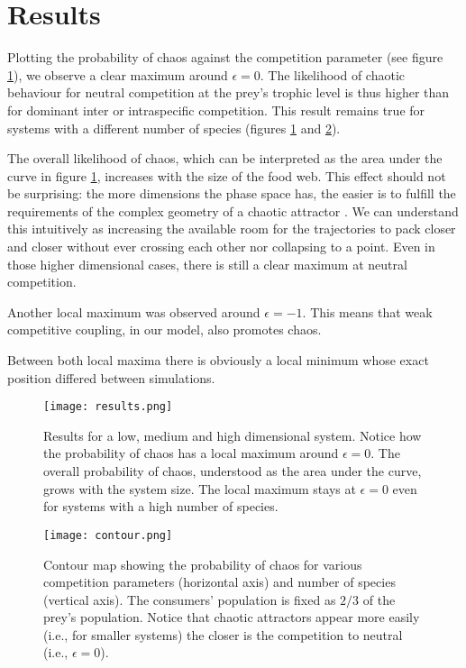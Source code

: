 \section{Results}
\label{sec:Results}
Plotting the probability of chaos against the competition parameter (see figure \ref{fig:Results}), we observe a clear maximum around $ \epsilon = 0 $. The likelihood of chaotic behaviour for neutral competition at the prey's trophic level is thus higher than for dominant inter or intraspecific competition. This result remains true for systems with a different number of species (figures \ref{fig:Results} and \ref{fig:Contour}).

The overall likelihood of chaos, which can be interpreted as the area under the curve in figure \ref{fig:Results}, increases with the size of the food web. This effect should not be surprising: the more dimensions the phase space has, the easier is to fulfill the requirements of the complex geometry of a chaotic attractor \cite{Strogatz1994}. We can understand this intuitively as increasing the available room for the trajectories to pack closer and closer without ever crossing each other nor collapsing to a point. Even in those higher dimensional cases, there is still a clear maximum at neutral competition.

Another local maximum was observed around $ \epsilon = -1 $. This means that weak competitive coupling, in our model, also promotes chaos.

Between both local maxima there is obviously a local minimum whose exact position differed between simulations.

\begin{figure}
	\begin{center}
		\texttt{[image: results.png]}
	\end{center}
	\caption{Results for a low, medium and high dimensional system. Notice how the probability of chaos has a local maximum around $\epsilon = 0$. The overall probability of chaos, understood as the area under the curve, grows with the system size. The local maximum stays at $\epsilon = 0$ even for systems with a high number of species.}
	\label{fig:Results}
\end{figure}

\begin{figure}
	\begin{center}
		\texttt{[image: contour.png]}
	\end{center}
	\caption{Contour map showing the probability of chaos for various competition parameters (horizontal axis) and number of species (vertical axis). The consumers' population is fixed as $ 2/3 $ of the prey's population. Notice that chaotic attractors appear more easily (i.e., for smaller systems) the closer is the competition to neutral (i.e., $ \epsilon = 0 $).}
	\label{fig:Contour}
\end{figure}